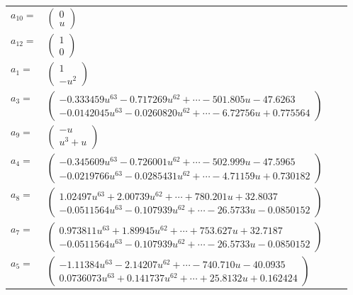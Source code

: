 \documentclass[1p]{elsarticle_modified}
\theoremstyle{definition}
\begin{document}
\begin{tabular}{m{7pt} m{180pt} m{7pt} m{180pt} }
\flushright $a_{10}=$&$\begin{pmatrix}0\\u\end{pmatrix}$ \\
\flushright $a_{12}=$&$\begin{pmatrix}1\\0\end{pmatrix}$ \\
\flushright $a_{1}=$&$\begin{pmatrix}1\\- u^2\end{pmatrix}$ \\
\flushright $a_{3}=$&$\begin{pmatrix}-0.333459 u^{63}-0.717269 u^{62}+\cdots-501.805 u-47.6263\\-0.0142045 u^{63}-0.0260820 u^{62}+\cdots-6.72756 u+0.775564\end{pmatrix}$ \\
\flushright $a_{9}=$&$\begin{pmatrix}- u\\u^3+u\end{pmatrix}$ \\
\flushright $a_{4}=$&$\begin{pmatrix}-0.345609 u^{63}-0.726001 u^{62}+\cdots-502.999 u-47.5965\\-0.0219766 u^{63}-0.0285431 u^{62}+\cdots-4.71159 u+0.730182\end{pmatrix}$ \\
\flushright $a_{8}=$&$\begin{pmatrix}1.02497 u^{63}+2.00739 u^{62}+\cdots+780.201 u+32.8037\\-0.0511564 u^{63}-0.107939 u^{62}+\cdots-26.5733 u-0.0850152\end{pmatrix}$ \\
\flushright $a_{7}=$&$\begin{pmatrix}0.973811 u^{63}+1.89945 u^{62}+\cdots+753.627 u+32.7187\\-0.0511564 u^{63}-0.107939 u^{62}+\cdots-26.5733 u-0.0850152\end{pmatrix}$ \\
\flushright $a_{5}=$&$\begin{pmatrix}-1.11384 u^{63}-2.14207 u^{62}+\cdots-740.710 u-40.0935\\0.0736073 u^{63}+0.141737 u^{62}+\cdots+25.8132 u+0.162424\end{pmatrix}$ \\

\end{tabular}
\end{document}
